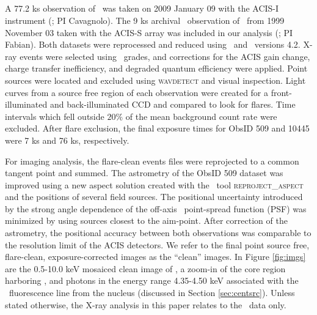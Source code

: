 \documentclass[useAMS,usenatbib]{mn2e}
\begin{document}
\subsection{\chandra}
\label{sec:xray}

A 77.2 ks observation of \irs\ was taken on 2009 January 09 with the
ACIS-I instrument (; PI
Cavagnolo). The 9 ks archival \chandra\ observation of \irs\ from 1999
November 03 taken with the ACIS-S array was included in our analysis
(; PI Fabian). Both
datasets were reprocessed and reduced using \ciao\ and
\caldb\ versions 4.2. X-ray events were selected using \asca\ grades,
and corrections for the ACIS gain change, charge transfer
inefficiency, and degraded quantum efficiency were applied. Point
sources were located and excluded using {\textsc{wavdetect}} and
visual inspection. Light curves from a source free region of each
observation were created for a front-illuminated and back-illuminated
CCD and compared to look for flares. Time intervals which fell outside
$20\%$ of the mean background count rate were excluded. After flare
exclusion, the final exposure times for ObsID 509 and 10445 were 7 ks
and 76 ks, respectively.

For imaging analysis, the flare-clean events files were reprojected to
a common tangent point and summed. The astrometry of the ObsID 509
dataset was improved using a new aspect solution created with the
\ciao\ tool {\textsc{reproject\_aspect}} and the positions of several
field sources. The positional uncertainty introduced by the strong
angle dependence of the off-axis \chandra\ point-spread function (PSF)
was minimized by using sources closest to the aim-point. After
correction of the astrometry, the positional accuracy between both
observations was comparable to the resolution limit of the ACIS
detectors. We refer to the final point source free, flare-clean,
exposure-corrected images as the ``clean'' images. In Figure
\ref{fig:imgs} are the 0.5-10.0 keV mosaiced clean image of \rxj, a
zoom-in of the core region harboring \irs, and photons in the energy
range 4.35-4.50 keV associated with the \feka\ fluorescence line from
the nucleus (discussed in Section \ref{sec:centsrc}). Unless stated
otherwise, the X-ray analysis in this paper relates to the
\chandra\ data only.

\subsection{\xmm}
\label{sec:xmm}
\end{document}
